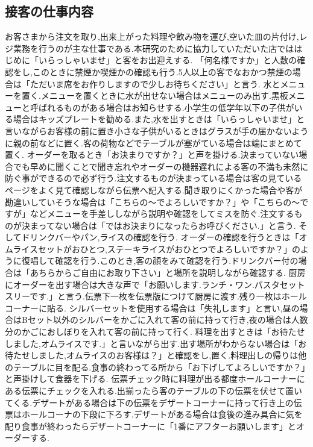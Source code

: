 \documentclass[11pt]{si2016}
\begin{document}
\subsection{接客の仕事内容}
お客さまから注文を取り,出来上がった料理や飲み物を運び,空いた皿の片付け,レジ業務を行うのが主な仕事である.本研究のために協力していただいた店でははじめに「いらっしゃいませ」と客をお出迎えする.
「何名様ですか」と人数の確認をし,このときに禁煙か喫煙かの確認も行う.5人以上の客でなおかつ禁煙の場合は「ただいま席をお作りしますので少しお待ちください」と言う.
水とメニューを置く.メニューを置くときに水が出せない場合はメニューのみ出す.黒板メニューと呼ばれるものがある場合はお知らせする.小学生の低学年以下の子供がいる場合はキッズプレートを勧める.また,水を出すときは「いらっしゃいませ」と言いながらお客様の前に置き小さな子供がいるときはグラスが手の届かないように親の前などに置く.客の荷物などでテーブルが塞がている場合は端にまとめて置く.
オーダーを取るとき「お決まりですか？」と声を掛ける.決まっていない場合でも早めに聞くことで聞き忘れやオーダーの機器遅れによる客の不満も未然に防ぐ事ができるので必ず行う.注文するものが決まっている場合は客の見ているページをよく見て確認しながら伝票へ記入する.聞き取りにくかった場合や客が勘違いしていそうな場合は「こちらの〜でよろしいですか？」や「こちらの〜ですが」などメニューを手差ししながら説明や確認をしてミスを防ぐ.注文するものが決まってない場合は「ではお決まりになったらお呼びください.」と言う.
そしてドリンクバーやパン,ライスの確認を行う.
オーダーの確認を行うときは「オムライスセットがおひとつ,ステーキライスがおひとつでよろしいですか？」のように復唱して確認を行う.このとき,客の顔をみて確認を行う.ドリンクバー付の場合は「あちらからご自由にお取り下さい」と場所を説明しながら確認する.
厨房にオーダーを出す場合は大きな声で「お願いします.ランチ・ワン.パスタセットスリーです.」と言う.伝票下一枚を伝票版につけて厨房に渡す.残り一枚はホールコーナーに貼る.
シルバーセットを使用する場合は「失礼します」と言い,昼の場合はBセット以外のシルバーをかごに入れて客の前に持って行き,夜の場合は人数分のかごにおしぼりを入れて客の前に持って行く.
料理を出すときは「お待たせしました,オムライスです.」と言いながら出す.出す場所がわからない場合は「お待たせしました,オムライスのお客様は？」と確認をし,置く.料理出しの帰りは他のテーブルに目を配る.食事の終わってる所から「お下げしてよろしいですか？」と声掛けして食器を下げる.
伝票チェック時に料理が出る都度ホールコーナーにある伝票にチェックを入れる.出揃ったら客のテーブルの下の伝票を伏せて置いてくる.デザートがある場合は下の伝票をデザートコーナーに持って行き上の伝票はホールコーナの下段に下ろす.デザートがある場合は食後の進み具合に気を配り食事が終わったらデザートコーナーに「1番にアフターお願いします」とオーダーする.
\end{document}
